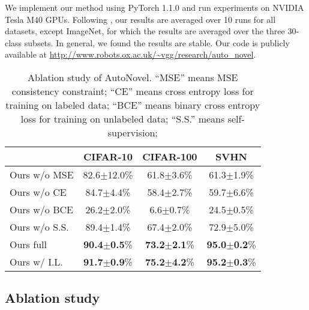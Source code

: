 We implement our method using PyTorch 1.1.0 and run experiments on NVIDIA Tesla M40 GPUs. Following \cite{han2019learning}, our results are averaged over 10 runs for all datasets, except ImageNet, for which the results are averaged over the three 30-class subsets.  In general, we found the results are stable. Our code is publicly available at \url{http://www.robots.ox.ac.uk/~vgg/research/auto_novel}.

\begin{table}[t]
\centering
\caption{Ablation study of AutoNovel. ``MSE'' means MSE consistency constraint; ``CE'' means cross entropy loss for training on labeled data; ``BCE'' means binary cross entropy loss for training on unlabeled data; ``S.S.'' means self-supervision;  }\label{tab:ablation_unlabelled}
\begin{tabular}[c]{lccc}
\toprule
          & CIFAR-10     & CIFAR-100     & SVHN \\
\midrule
Ours w/o MSE & 82.6$\pm$12.0\% & 61.8$\pm$3.6\% & 61.3$\pm$1.9\%   \\
Ours w/o CE & 84.7$\pm$4.4\%  & 58.4$\pm$2.7\% & 59.7$\pm$6.6\%  \\
Ours w/o BCE & 26.2$\pm$2.0\%  & 6.6$\pm$0.7\% & 24.5$\pm$0.5\% \\
Ours w/o S.S.& 89.4$\pm$1.4\%  & 67.4$\pm$2.0\% & 72.9$\pm$5.0\% \\\midrule
Ours full   & \textbf{90.4$\pm$0.5}\% & \textbf{73.2$\pm$2.1}\%  & \textbf{95.0$\pm$0.2}\% \\
Ours w/ I.L.  & \textbf{91.7$\pm$0.9}\% & \textbf{75.2$\pm$4.2}\% & \textbf{95.2$\pm$0.3}\% \\
\bottomrule
\end{tabular}\hfill 

\end{table} 
\subsection{Ablation study}

